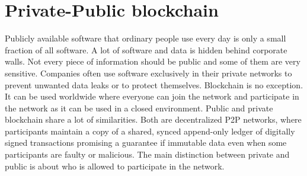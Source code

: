 \section{Private-Public blockchain}
Publicly available software that ordinary people use every day is only a small fraction of all software. A lot of software and data is hidden behind corporate walls. Not every piece of information should be public and some of them are very sensitive. Companies often use software exclusively in their private networks to prevent unwanted data leaks or to protect themselves. Blockchain is no exception. It can be used worldwide where everyone can join the network and participate in the network as it can be used in a closed environment. Public and private blockchain share a lot of similarities. Both are decentralized P2P networks, where participants maintain a copy of a shared, synced append-only ledger of digitally signed transactions promising a guarantee if immutable data even when some participants are faulty or malicious. The main distinction between private and public is about who is allowed to participate in the network.
